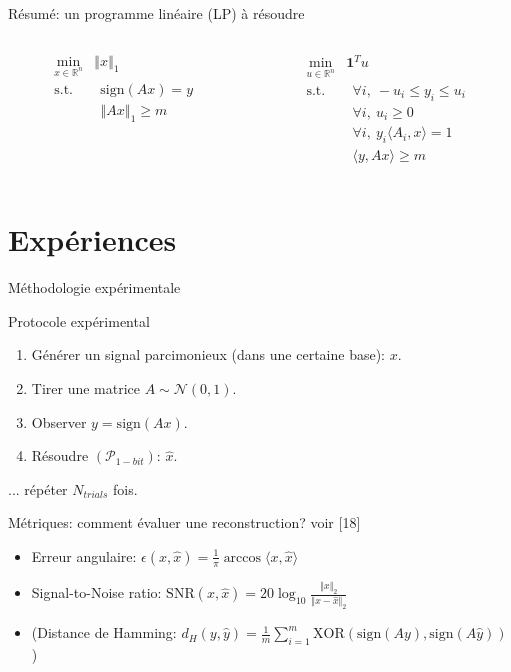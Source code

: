 \documentclass[10pt, aspectratio=169]{beamer}
\newcommand{\norm}[1]{\left\Vert #1 \right\Vert}
\begin{document}
\begin{frame}{Résumé: un programme linéaire (LP) à résoudre}
\smallskip
\begin{columns}
    \begin{column}{0.45\textwidth}
   \begin{align*}
       \min_{x\in\mathbb R^n}{}& \norm{x}_1 \\
       \mathrm{s.t.} & ~~\mathrm{sign}(Ax)=y \\
       & ~~ \norm{Ax}_1\geq m 
   \end{align*}
    \end{column}
    \pause
    \begin{column}{0.45\textwidth}
   \begin{align*}
       \min_{u\in\mathbb R^n}{}& \mathbf{1}^T u \\
       \mathrm{s.t.}& ~~ \forall i, ~-u_i \leq y_i \leq u_i\\
       & ~~\forall i, ~u_i \geq 0\\
       & ~~\forall i, ~y_i\langle A_i, x\rangle=1\\
       & ~~ \langle y, Ax\rangle\geq m 
   \end{align*}
    \end{column}
\end{columns}
    
\end{frame}


\section{Expériences}
\begin{frame}{Méthodologie expérimentale}
\begin{block}{Protocole expérimental}
\smallskip
\begin{enumerate}
    \item Générer un signal parcimonieux (dans une certaine base): $x$.
    \item Tirer une matrice $A\sim \mathcal N(0, 1)$.
    \item Observer $y=\mathrm{sign}(Ax)$.
    \item Résoudre $(\mathcal P_{1-bit})$: $\hat x$.
\end{enumerate}
... répéter $N_{trials}$ fois.
    
\end{block}
\pause
\begin{block}{Métriques: comment évaluer une reconstruction? voir [18]}
\smallskip
\begin{itemize}
\item Erreur angulaire: $\epsilon(x, \hat x) = \frac{1}{\pi}\arccos \langle x, \hat x \rangle$
\item Signal-to-Noise ratio: $\mathrm{SNR}(x, \hat x) = 20 \log_{10} \frac{\Vert x\Vert_2}{\Vert x - \hat x\Vert_2}$
\item (Distance de Hamming: $d_H(y, \hat y) = \frac{1}{m}\sum_{i=1}^m \mathrm{XOR}(\mathrm{sign}(Ay),\mathrm{sign}(A\hat y))$)
\end{itemize}
\end{block}
\end{frame}
\end{document}
